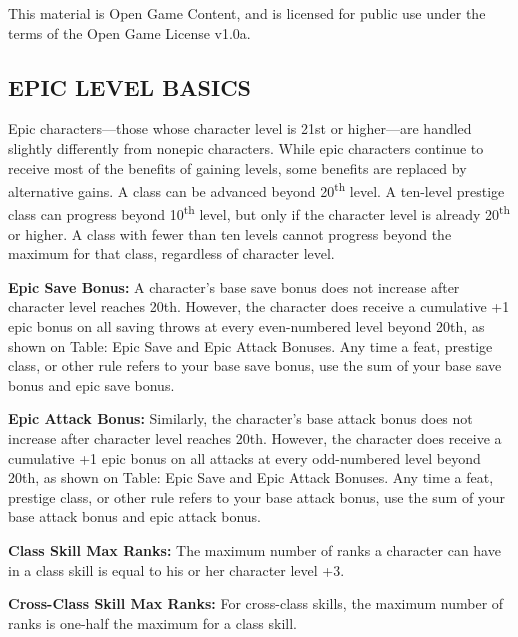 \documentclass{article}
\begin{document}
This material is Open Game Content, and is licensed for public use under the terms 
of the Open Game License v1.0a.

\subsection*{{\LARGE{}EPIC LEVEL BASICS}}

\vspace{12pt}
Epic characters---those whose character level is 21st or higher---are handled slightly 
differently from nonepic characters. While epic characters continue to receive 
most of the benefits of gaining levels, some benefits are replaced by alternative 
gains. A class can be advanced beyond 20\textsuperscript{th} level.  A ten-level 
prestige class can progress beyond 10\textsuperscript{th} level, but only if the 
character level is already 20\textsuperscript{th} or higher.  A class with fewer 
than ten levels cannot progress beyond the maximum for that class, regardless of 
character level.

\vspace{12pt}
\textbf{Epic Save Bonus:} A character's base save bonus does not increase after 
character level reaches 20th. However, the character does receive a cumulative 
+1 epic bonus on all saving throws at every even-numbered level beyond 20th, as 
shown on Table: Epic Save and Epic Attack Bonuses. Any time a feat, prestige class, 
or other rule refers to your base save bonus, use the sum of your base save bonus 
and epic save bonus.

\vspace{12pt}
\textbf{Epic Attack Bonus:} Similarly, the character's base attack bonus does not 
increase after character level reaches 20th. However, the character does receive 
a cumulative +1 epic bonus on all attacks at every odd-numbered level beyond 20th, 
as shown on Table: Epic Save and Epic Attack Bonuses. Any time a feat, prestige 
class, or other rule refers to your base attack bonus, use the sum of your base 
attack bonus and epic attack bonus.

\vspace{12pt}
\textbf{Class Skill Max Ranks:} The maximum number of ranks a character can have 
in a class skill is equal to his or her character level +3. 

\vspace{12pt}
\textbf{Cross-Class Skill Max Ranks:} For cross-class skills, the maximum number 
of ranks is one-half the maximum for a class skill. 
\end{document}
